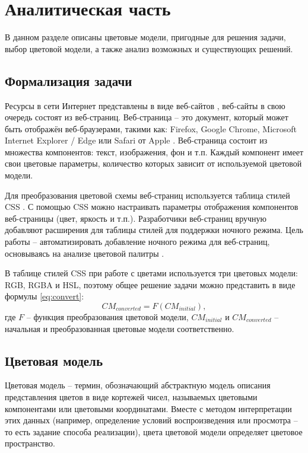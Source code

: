\chapter{Аналитическая часть}

В данном разделе описаны цветовые модели, пригодные для решения задачи, выбор цветовой модели, а также анализ возможных и существующих решений.

\section{Формализация задачи}

Ресурсы в сети Интернет представлены в виде веб-сайтов \cite{webpage}, веб-сайты в свою очередь состоят из веб-страниц. Веб-страница -- это документ, который может быть отображён веб-браузерами, такими как: Firefox, Google Chrome, Microsoft Internet Explorer / Edge или Safari от Apple \cite{webpage}. Веб-страница состоит из множества компонентов: текст, изображения, фон и т.п. Каждый компонент имеет свои цветовые параметры, количество которых зависит от используемой цветовой модели.

Для преобразования цветовой схемы веб-страниц используется таблица стилей CSS \cite{css}. С помощью CSS можно настраивать параметры отображения компонентов веб-страницы (цвет, яркость и т.п.). Разработчики веб-страниц вручную добавляют расширения для таблицы стилей для поддержки ночного режима. Цель работы -- автоматизировать добавление ночного режима для веб-страниц, основываясь на анализе цветовой палитры \cite{colorpalette}.

В таблице стилей CSS при работе с цветами используется три цветовых модели: RGB, RGBA и HSL, поэтому общее решение задачи можно представить в виде формулы \ref{eq:convert}:
\begin{equation}
	\label{eq:convert}
	CM_{converted} = F(CM_{initial}),
\end{equation}
где $F$ -- функция преобразования цветовой модели, $CM_{initial}$ и $CM_{converted}$ -- начальная и преобразованная цветовые модели соответственно.

\section{Цветовая модель}

Цветовая модель -- термин, обозначающий абстрактную модель описания представления цветов в виде кортежей чисел, называемых цветовыми компонентами или цветовыми координатами. Вместе с методом интерпретации этих данных (например, определение условий воспроизведения или просмотра -- то есть задание способа реализации), цвета цветовой модели определяет цветовое пространство.

